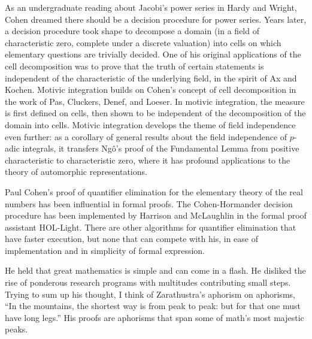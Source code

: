 \documentclass{llncs}
\begin{document}
\smallskip



As an undergraduate reading about Jacobi's power series in Hardy and Wright, Cohen dreamed there should be 
a decision procedure for power series.   Years later, a decision procedure took 
shape to decompose a domain (in a field of characteristic zero, complete under a discrete valuation) into 
cells on which elementary questions are trivially decided.
One of his original applications of the
cell decomposition was to prove that the truth of certain statements is independent of the characteristic of the underlying field, in the spirit of Ax and Kochen.
Motivic integration builds on Cohen's concept of cell decomposition in the work of Pas, Cluckers, Denef, and Loeser.  In motivic integration, the measure is first defined on cells, then shown to be independent of the decomposition of the domain into cells.  
Motivic integration develops the theme of field independence even further: as a corollary of general results about the field independence of $p$-adic integrals, it transfers Ng\^o's proof of the Fundamental Lemma  from positive characteristic to characteristic zero, where it has profound applications to the theory of automorphic representations.

Paul Cohen's proof of quantifier elimination for the elementary theory of the real numbers has been influential
in formal proofs.  The
Cohen-Hormander decision procedure has been implemented by
Harrison and McLaughlin
in the formal proof assistant HOL-Light.  There are other algorithms for
quantifier elimination that have faster execution, but none that can compete with his, in ease of implementation and in simplicity of formal expression. 


He held that great
mathematics is simple and can come in a flash.
He disliked the rise of ponderous research programs with multitudes contributing
small steps.
Trying to sum up his thought, I think of Zarathustra's aphorism on aphorisms, ``In the mountains, the shortest way is from peak to peak: but for that one must have long legs.''  His proofs are aphorisms that span some of math's most
majestic peaks.  

\bigskip
\noindent
\end{document}
